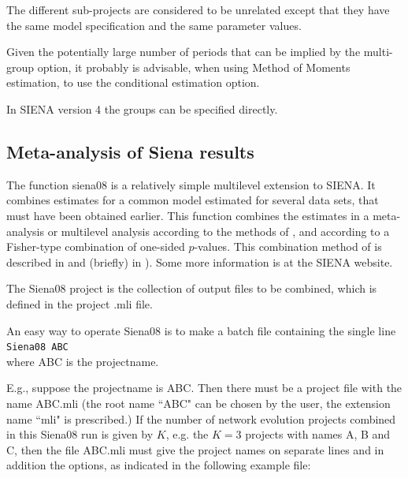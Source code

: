 \documentclass[a4paper,fleqn]{article}
\newcommand{\+}{\, + \,}
\newcommand{\SI}{{\sf SIENA }}
\newcommand{\si}{{\sf SIENA}}
\begin{document}
{The different sub-projects are considered to be unrelated
except that they have the same model specification and the same
parameter values.

Given the potentially large number of periods that can be implied
by the multi-group option, it probably is advisable,
when using Method of Moments estimation, to use
the conditional estimation option.

In \SI version 4 the groups can be specified directly.



\subsection{Meta-analysis of Siena results}
\label{S_Siena08}

The function \textsf{siena08} is a relatively simple
multilevel extension to \si.
It combines estimates for a common model
   estimated for several data sets,
   that must have been obtained earlier.
   This function combines
   the estimates in a meta-analysis or multilevel analysis
   according to the methods of \citet{SnijdersBaerveldt03},
   and according to a Fisher-type combination of one-sided $p$-values.
   This combination method of \citet{Fisher32} is described in
\citet{HedgesOlkin85}
   and (briefly) in \citet[Chapter 3]{SnijdersBosker99}).
   Some more information is at the \SI website.

\iffalse
   The \textsf{Siena08} project is the collection of output files
   to be combined, which is defined in the project \textsf{.mli} file.

   An easy way to operate \textsf{Siena08} is
    to make a batch file containing the single line
     \smallskip \\
     {\tt Siena08 ABC} \smallskip \\
   where \textsf{ABC} is the projectname.

   E.g., suppose the projectname is \textsf{ABC}.
   Then there must be a project file with the name \textsf{ABC.mli}
   (the root name ``\textsf{ABC}" can be chosen by the user,
   the extension name ``\textsf{mli}" is prescribed.)
   If the number of network evolution projects combined in this \textsf{Siena08} run
   is given by $K$, e.g. the $K=3$ projects with names A, B and C,
   then the file \textsf{ABC.mli} must give the project names
   on separate lines and in addition the options, as indicated
   in the following example file:

}
\end{document}
